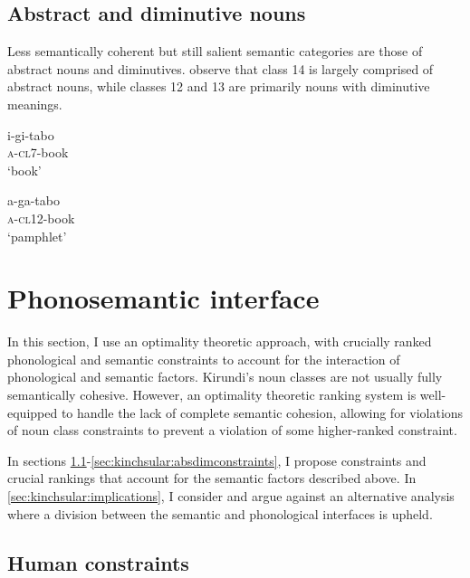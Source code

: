 \documentclass[output=paper,colorlinks,citecolor=brown,
]{langscibook}
\begin{document}
\subsection{Abstract and diminutive nouns} \label{sec:kinchsular:absdim}

Less semantically coherent but still salient semantic categories are those of abstract nouns and diminutives. \citet{zorc2007kinyarwanda} observe that class 14 is largely comprised of abstract nouns, while classes 12 and 13 are primarily nouns with diminutive meanings. 

\ea \label{ex:kinchsular:ad1}
\begin{xlist}

\ex \label{ex:kinchsular:ad1a}
\gll i-gi-tabo \\ 
\textsc{a}-\textsc{cl7}-book \\
\glt `book'

\ex \label{ex:kinchsular:ad1b}
\gll a-ga-tabo \\ 
\textsc{a}-\textsc{cl12}-book  \\
\glt `pamphlet'

\end{xlist}

\z 

\section{Phonosemantic interface} \label{sec:kinchsular:interface}

In this section, I use an optimality theoretic approach, with crucially ranked phonological and semantic constraints to account for the interaction of phonological and semantic factors. Kirundi's noun classes are not usually fully semantically cohesive. However, an optimality theoretic ranking system is well-equipped to handle the lack of complete semantic cohesion, allowing for violations of noun class constraints to prevent a violation of some higher-ranked constraint.

In sections \ref{sec:kinchsular:human}-\ref{sec:kinchsular:absdimconstraints}, I propose constraints and crucial rankings that account for the semantic factors described above. In \ref{sec:kinchsular:implications}, I consider and argue against an alternative analysis where a division between the semantic and phonological interfaces is upheld.

\subsection{Human constraints} \label{sec:kinchsular:human}
\end{document}
